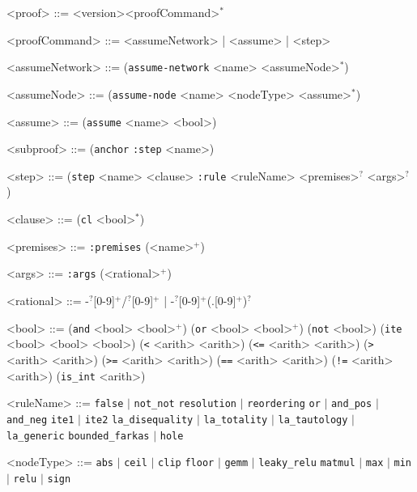 \begin{grammar}\footnotesize
	<proof> ::=  <version><proofCommand>$^*$ 
	
	<proofCommand> ::= <assumeNetwork>
	| <assume>
	| <step>
	
	<assumeNetwork> ::=  (\texttt{assume-network} <name> <assumeNode>$^*$)
	
	<assumeNode> ::=  (\texttt{assume-node} <name> <nodeType> <assume>$^*$)
	
	
	<assume> ::= (\texttt{assume} <name> <bool>)

	<subproof> ::= (\texttt{anchor} \texttt{:step} <name>)
	
	<step> ::= (\texttt{step} <name> <clause> \texttt{:rule} <ruleName> <premises>$^?$ <args>$^?$ )
	
	<clause> ::= (\texttt{cl} <bool>$^*$)
	
	<premises> ::= \texttt{:premises} (<name>$^+$)
	
	<args> ::= \texttt{:args} (<rational>$^+$)
	
	<rational> ::= -$^?$[0-9]$^+$/$^?$[0-9]$^+$ 
	| -$^?$[0-9]$^+$(.[0-9]$^+$)$^?$
		
	<bool> ::= (\texttt{and} <bool> <bool>$^+$)
	\alt (\texttt{or} <bool> <bool>$^+$)
	\alt (\texttt{not} <bool>)
	\alt (\texttt{ite} <bool> <bool> <bool>)
	\alt (\texttt{\textless} <arith> <arith>)
	\alt (\texttt{\textless=} <arith> <arith>)
	\alt (\texttt{\textgreater} <arith> <arith>)
	\alt (\texttt{\textgreater=} <arith> <arith>)
	\alt (\texttt{==} <arith> <arith>)
	\alt (\texttt{!=} <arith> <arith>)
	\alt (\texttt{is\_int} <arith>)
	
	<ruleName> ::= \texttt{false} $\mid$ \texttt{not\_not}	
	\alt \texttt{resolution} $\mid$ \texttt{reordering}
	\alt \texttt{or} $\mid$ \texttt{and\_pos} $\mid$ \texttt{and\_neg}
	\alt \texttt{ite1} $\mid$ \texttt{ite2}
	\alt \texttt{la\_disequality}  $\mid$ \texttt{la\_totality} $\mid$ \texttt{la\_tautology} $\mid$ \texttt{la\_generic}   
	\alt \texttt{bounded\_farkas} $\mid$ \texttt{hole}
	
	<nodeType> ::= \texttt{abs} $\mid$ \texttt{ceil} $\mid$ \texttt{clip} 
	\alt \texttt{floor} $\mid$ \texttt{gemm} $\mid$ \texttt{leaky\_relu}
	\alt \texttt{matmul} $\mid$ \texttt{max} $\mid$ 
	\alt \texttt{min} $\mid$ \texttt{relu} $\mid$ \texttt{sign}
	
	
\end{grammar}